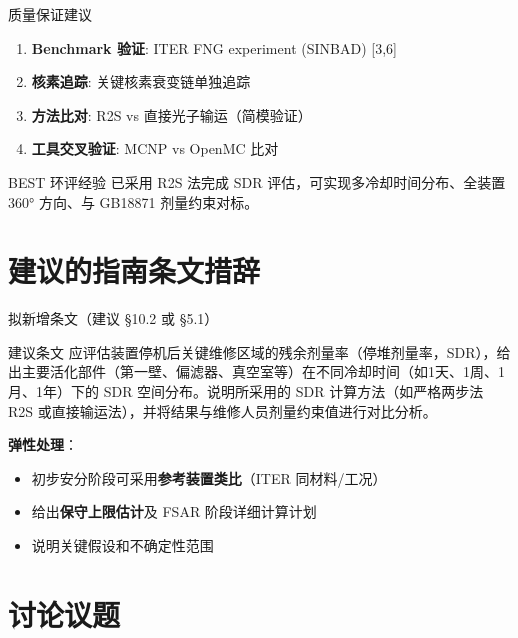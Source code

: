 \documentclass[aspectratio=169]{ctexbeamer}
\begin{document}
\begin{frame}{质量保证建议}
	\begin{enumerate}
		\item \textbf{Benchmark 验证}: ITER FNG experiment (SINBAD) [3,6]
		\item \textbf{核素追踪}: 关键核素衰变链单独追踪
		\item \textbf{方法比对}: R2S vs 直接光子输运（简模验证）
		\item \textbf{工具交叉验证}: MCNP vs OpenMC 比对
	\end{enumerate}

	\vspace{8pt}
	\begin{block}{BEST 环评经验}
		已采用 R2S 法完成 SDR 评估，可实现多冷却时间分布、全装置 360° 方向、与 GB18871 剂量约束对标。
	\end{block}
\end{frame}

\section{建议的指南条文措辞}

\begin{frame}{拟新增条文（建议 §10.2 或 §5.1）}
	\begin{block}{建议条文}
		应评估装置停机后关键维修区域的残余剂量率（停堆剂量率，SDR），给出主要活化部件（第一壁、偏滤器、真空室等）在不同冷却时间（如1天、1周、1月、1年）下的 SDR 空间分布。说明所采用的 SDR 计算方法（如严格两步法 R2S 或直接输运法），并将结果与维修人员剂量约束值进行对比分析。
	\end{block}

	\vspace{8pt}
	\textbf{弹性处理}：
	\begin{itemize}
		\item 初步安分阶段可采用\textbf{参考装置类比}（ITER 同材料/工况）
		\item 给出\textbf{保守上限估计}及 FSAR 阶段详细计算计划
		\item 说明关键假设和不确定性范围
	\end{itemize}
\end{frame}

\section{讨论议题}
\end{document}

